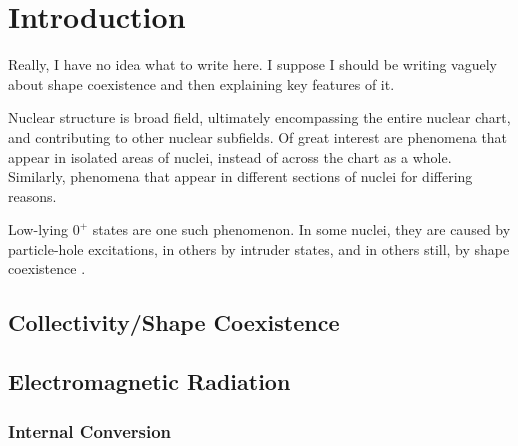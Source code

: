 %
%
%
%
%
%
%
%
%
%


%
%

\chapter{Introduction}

Really, I have no idea what to write here. I suppose I should be writing vaguely about shape coexistence and then explaining key features of it. 

Nuclear structure is broad field, ultimately encompassing the entire nuclear chart, and contributing to other nuclear subfields. Of great interest are phenomena that appear in isolated areas of nuclei, instead of across the chart as a whole. Similarly, phenomena that appear in different sections of nuclei for differing reasons.

Low-lying $0^+$ states are one such phenomenon. In some nuclei, they are caused by particle-hole excitations, in others by intruder states, and in others still, by shape coexistence \citep{wood99:_e0}.

\section{Collectivity/Shape Coexistence}


\section{Electromagnetic Radiation}

\subsection{Internal Conversion}

